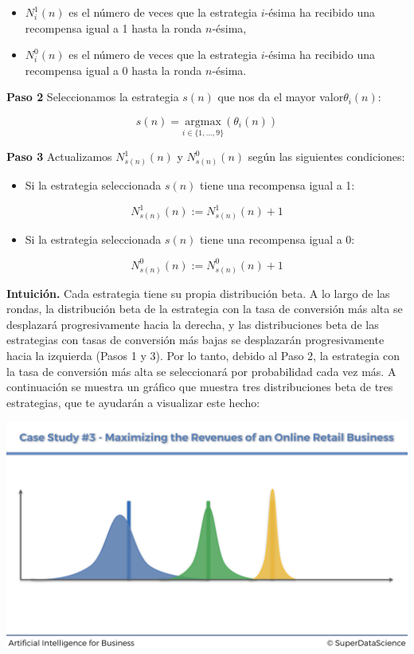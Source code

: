\documentclass[]{book}
\providecommand{\tightlist}{%
  \setlength{\itemsep}{0pt}\setlength{\parskip}{0pt}}
\begin{document}
\begin{itemize}
\tightlist
\item
  \(N_i^1(n)\) es el número de veces que la estrategia \(i\)-ésima ha recibido una recompensa igual a 1 hasta la ronda \(n\)-ésima,
\item
  \(N_i^0(n)\) es el número de veces que la estrategia \(i\)-ésima ha recibido una recompensa igual a 0 hasta la ronda \(n\)-ésima.
\end{itemize}

\textbf{Paso 2} Seleccionamos la estrategia \(s(n)\) que nos da el mayor valor\(\theta_i(n)\):

\[s(n) = \underset{i\in\{1,...,9\}}{\textrm{argmax}}(\theta_i(n))\]

\textbf{Paso 3} Actualizamos \(N_{s(n)}^1(n)\) y \(N_{s(n)}^0(n)\) según las siguientes condiciones:

\begin{itemize}
\tightlist
\item
  Si la estrategia seleccionada \(s(n)\) tiene una recompensa igual a 1:
\end{itemize}

\[N_{s(n)}^1(n) := N_{s(n)}^1(n) + 1\]

\begin{itemize}
\tightlist
\item
  Si la estrategia seleccionada \(s(n)\) tiene una recompensa igual a 0:
\end{itemize}

\[N_{s(n)}^0(n) := N_{s(n)}^0(n) + 1\]

\textbf{Intuición.} Cada estrategia tiene su propia distribución beta. A lo largo de las rondas, la distribución beta de la estrategia con la tasa de conversión más alta se desplazará progresivamente hacia la derecha, y las distribuciones beta de las estrategias con tasas de conversión más bajas se desplazarán progresivamente hacia la izquierda (Pasos 1 y 3). Por lo tanto, debido al Paso 2, la estrategia con la tasa de conversión más alta se seleccionará por probabilidad cada vez más. A continuación se muestra un gráfico que muestra tres distribuciones beta de tres estrategias, que te ayudarán a visualizar este hecho:

\includegraphics{Images/Beta_Distribution_Slide.png}
\end{document}
